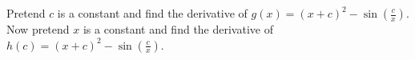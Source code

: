 Pretend $c$ is a constant and find the derivative of $\displaystyle g(x) = (x+c)^2 - \sin\left(\frac{c}{x}\right)$.  Now pretend $x$ is a constant and find the derivative of $\displaystyle h(c) = (x+c)^2 - \sin\left(\frac{c}{x}\right)$.
